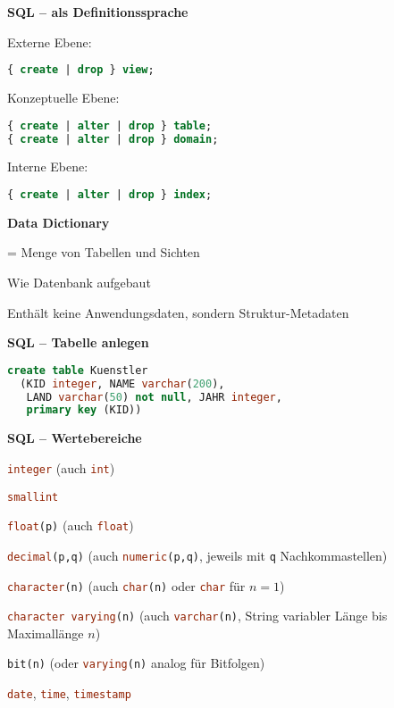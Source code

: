 \textbf{SQL -- als Definitionssprache}
\begin{enumeration}
	\item Externe Ebene: 
		\begin{lstlisting}[language=sql]
{ create | drop } view;
		\end{lstlisting}
	\item Konzeptuelle Ebene:
		\begin{lstlisting}[language=sql]
{ create | alter | drop } table;
{ create | alter | drop } domain;
		\end{lstlisting}
	\item Interne Ebene:
			\begin{lstlisting}[language=sql]
{ create | alter | drop } index;
		\end{lstlisting}
\end{enumeration}

\textbf{Data Dictionary}
\begin{items}
	\item = Menge von Tabellen und Sichten
	\item Wie Datenbank aufgebaut
	\item Enthält keine Anwendungsdaten, sondern Struktur-Metadaten
\end{items}

\textbf{SQL -- Tabelle anlegen}
\begin{items}
	\item \begin{lstlisting}[language=sql]
create table Kuenstler
  (KID integer, NAME varchar(200), 
   LAND varchar(50) not null, JAHR integer, 
   primary key (KID))
\end{lstlisting}
\end{items}

\textbf{SQL -- Wertebereiche}
\begin{items}
	\item \lstinline[language=sql]{integer} (auch \lstinline[language=sql]{int})
	\item \lstinline[language=sql]{smallint}
	\item \lstinline[language=sql]{float(p)} (auch \lstinline[language=sql]{float})
	\item \lstinline[language=sql]{decimal(p,q)} (auch \lstinline[language=sql]{numeric(p,q)}, jeweils mit \lstinline[language=sql]{q} Nachkommastellen)
	\item \lstinline[language=sql]{character(n)} (auch \lstinline[language=sql]{char(n)} oder \lstinline[language=sql]{char} für \( n=1 \))
	\item \lstinline[language=sql]{character varying(n)} (auch \lstinline[language=sql]{varchar(n)}, String variabler Länge bis Maximallänge \( n \))
	\item \lstinline[language=sql]{bit(n)} (oder \lstinline[language=sql]{varying(n)} analog für Bitfolgen)
	\item \lstinline[language=sql]{date}, \lstinline[language=sql]{time}, \lstinline[language=sql]{timestamp}
\end{items}

